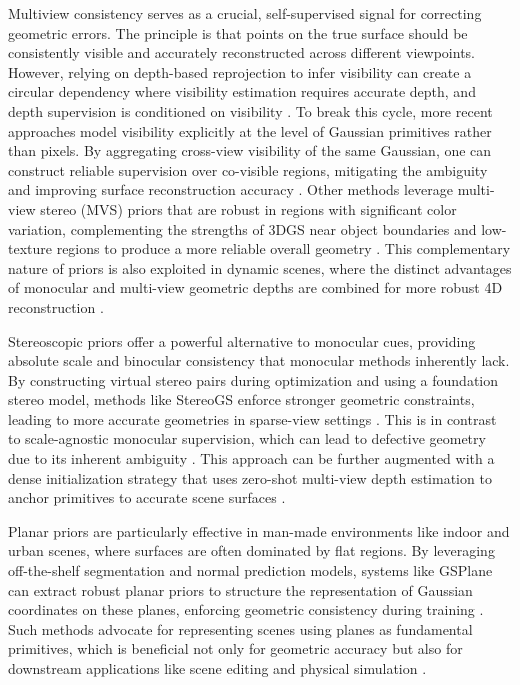 \documentclass[11pt]{article}
\begin{document}
Multiview consistency serves as a crucial, self-supervised signal for correcting geometric errors. The principle is that points on the true surface should be consistently visible and accurately reconstructed across different viewpoints. However, relying on depth-based reprojection to infer visibility can create a circular dependency where visibility estimation requires accurate depth, and depth supervision is conditioned on visibility \cite{ref189}. To break this cycle, more recent approaches model visibility explicitly at the level of Gaussian primitives rather than pixels. By aggregating cross-view visibility of the same Gaussian, one can construct reliable supervision over co-visible regions, mitigating the ambiguity and improving surface reconstruction accuracy \cite{ref189}. Other methods leverage multi-view stereo (MVS) priors that are robust in regions with significant color variation, complementing the strengths of 3DGS near object boundaries and low-texture regions to produce a more reliable overall geometry \cite{ref190}. This complementary nature of priors is also exploited in dynamic scenes, where the distinct advantages of monocular and multi-view geometric depths are combined for more robust 4D reconstruction \cite{ref191}.

Stereoscopic priors offer a powerful alternative to monocular cues, providing absolute scale and binocular consistency that monocular methods inherently lack. By constructing virtual stereo pairs during optimization and using a foundation stereo model, methods like StereoGS enforce stronger geometric constraints, leading to more accurate geometries in sparse-view settings \cite{ref192}. This is in contrast to scale-agnostic monocular supervision, which can lead to defective geometry due to its inherent ambiguity \cite{ref192}. This approach can be further augmented with a dense initialization strategy that uses zero-shot multi-view depth estimation to anchor primitives to accurate scene surfaces \cite{ref192}.

Planar priors are particularly effective in man-made environments like indoor and urban scenes, where surfaces are often dominated by flat regions. By leveraging off-the-shelf segmentation and normal prediction models, systems like GSPlane can extract robust planar priors to structure the representation of Gaussian coordinates on these planes, enforcing geometric consistency during training \cite{ref193}. Such methods advocate for representing scenes using planes as fundamental primitives, which is beneficial not only for geometric accuracy but also for downstream applications like scene editing and physical simulation \cite{ref193}.
\end{document}

